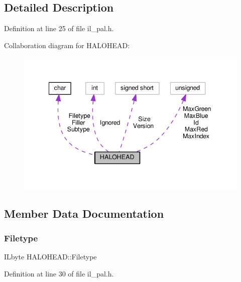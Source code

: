 \subsection{Detailed Description}


Definition at line 25 of file il\+\_\+pal.\+h.



Collaboration diagram for H\+A\+L\+O\+H\+E\+AD\+:
\nopagebreak
\begin{figure}[H]
\begin{center}
\leavevmode
\includegraphics[width=341pt]{d0/df8/structHALOHEAD__coll__graph}
\end{center}
\end{figure}


\subsection{Member Data Documentation}
\mbox{\label{structHALOHEAD_a3f31d78fa620110f5dffc893f1e2e719}} 
\subsubsection{\texorpdfstring{Filetype}{Filetype}}
{\footnotesize\ttfamily I\+Lbyte H\+A\+L\+O\+H\+E\+A\+D\+::\+Filetype}



Definition at line 30 of file il\+\_\+pal.\+h.

\mbox{\label{structHALOHEAD_a05580dde11dfe50f3412b928e1f9b7ba}} 
